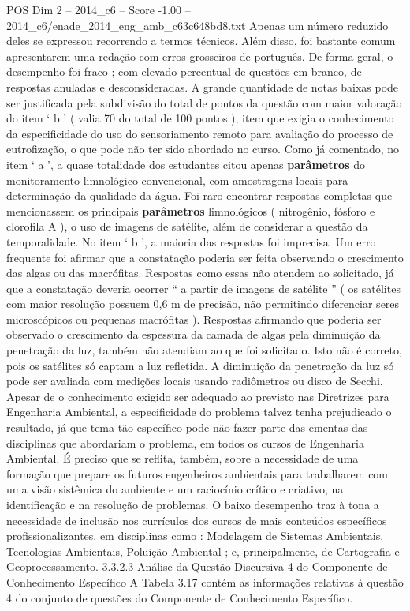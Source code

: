 \begin{textsample}{POS Dim 2 – 2014\_c6 – Score -1.00 – 2014\_c6/enade\_2014\_eng\_amb\_c63c648bd8.txt}
Apenas um número reduzido deles se expressou recorrendo a termos técnicos.
Além disso, foi bastante comum apresentarem uma redação com erros grosseiros de português.
De forma geral, o desempenho foi fraco ; com elevado percentual de questões em branco, de respostas anuladas e desconsideradas.
A grande quantidade de notas baixas pode ser justificada pela subdivisão do total de pontos da questão com maior valoração do item ‘ b ’ ( valia 70 do total de 100 pontos ), item que exigia o conhecimento da especificidade do uso do sensoriamento remoto para avaliação do processo de eutrofização, o que pode não ter sido abordado no curso.
Como já comentado, no item ‘ a ’, a quase totalidade dos estudantes citou apenas \textbf{parâmetros} do monitoramento limnológico convencional, com amostragens locais para determinação da qualidade da água.
Foi raro encontrar respostas completas que mencionassem os principais \textbf{parâmetros} limnológicos ( nitrogênio, fósforo e clorofila A ), o uso de imagens de satélite, além de considerar a questão da temporalidade.
No item ‘ b ’, a maioria das respostas foi imprecisa.
Um erro frequente foi afirmar que a constatação poderia ser feita observando o crescimento das algas ou das macrófitas.
Respostas como essas não atendem ao solicitado, já que a constatação deveria ocorrer “ a partir de imagens de satélite ” ( os satélites com maior resolução possuem 0,6 m de precisão, não permitindo diferenciar seres microscópicos ou pequenas macrófitas ).
Respostas afirmando que poderia ser observado o crescimento da espessura da camada de algas pela diminuição da penetração da luz, também não atendiam ao que foi solicitado.
Isto não é correto, pois os satélites só captam a luz refletida.
A diminuição da penetração da luz só pode ser avaliada com medições locais usando radiômetros ou disco de Secchi.
Apesar de o conhecimento exigido ser adequado ao previsto nas Diretrizes para Engenharia Ambiental, a especificidade do problema talvez tenha prejudicado o resultado, já que tema tão específico pode não fazer parte das ementas das disciplinas que abordariam o problema, em todos os cursos de Engenharia Ambiental.
É preciso que se reflita, também, sobre a necessidade de uma formação que prepare os futuros engenheiros ambientais para trabalharem com uma visão sistêmica do ambiente e um raciocínio crítico e criativo, na identificação e na resolução de problemas.
O baixo desempenho traz à tona a necessidade de inclusão nos currículos dos cursos de mais conteúdos específicos profissionalizantes, em disciplinas como : Modelagem de Sistemas Ambientais, Tecnologias Ambientais, Poluição Ambiental ; e, principalmente, de Cartografia e Geoprocessamento. 3.3.2.3 Análise da Questão Discursiva 4 do Componente de Conhecimento Específico A Tabela 3.17 contém as informações relativas à questão 4 do conjunto de questões do Componente de Conhecimento Específico.

\end{textsample}
